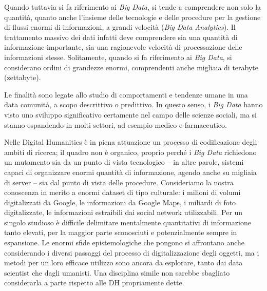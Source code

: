 \documentclass[
  b5paper,
  twoside,
  11pt,
  chapterprefix=false,
  bibliography=totocnumbered,
  listof=flat]{scrbook}
\begin{document}
Quando tuttavia si fa riferimento ai \emph{Big Data}, si tende a comprendere
non solo la quantità, quanto anche l'insieme delle tecnologie e delle
procedure per la gestione di flussi enormi di informazioni, a grandi
velocità (\emph{Big Data Analytics}). Il trattamento massivo dei dati infatti
deve comprendere sia una quantità di informazione importante, sia una
ragionevole velocità di processazione delle informazioni stesse.
Solitamente, quando si fa riferimento ai \emph{Big Data}, si considerano
ordini di grandezze enormi, comprendenti anche migliaia di terabyte
(zettabyte).

Le finalità sono legate allo studio di comportamenti e tendenze umane in
una data comunità, a scopo descrittivo o predittivo. In questo senso, i
\emph{Big Data} hanno visto uno sviluppo significativo certamente nel campo
delle scienze sociali, ma si stanno espandendo in molti settori, ad
esempio medico e farmaceutico.

Nelle Digital Humanities è in piena attuazione un processo di
codificazione degli ambiti di ricerca; il quadro non è organico, proprio
perché i \emph{Big Data} richiedono un mutamento sia da un punto di vista
tecnologico -- in altre parole, sistemi capaci di organizzare enormi
quantità di informazione, agendo anche su migliaia di server -- sia dal
punto di vista delle procedure. Consideriamo la nostra conoscenza in
merito a enormi dataset di tipo culturale: i milioni di volumi
digitalizzati da Google, le informazioni da Google Maps, i miliardi di
foto digitalizzate, le informazioni estraibili dai social network
utilizzabili. Per un singolo studioso è difficile delimitare mentalmente
quantitativi di informazione tanto elevati, per la maggior parte
sconosciuti e potenzialmente sempre in espansione. Le enormi sfide
epistemologiche che pongono si affrontano anche considerando i diversi
passaggi del processo di digitalizzazione degli oggetti, ma i metodi per
un loro efficace utilizzo sono ancora da esplorare, tanto dai data
scientist che dagli umanisti. Una disciplina simile non sarebbe
sbagliato considerarla a parte rispetto alle DH propriamente dette.
\end{document}
